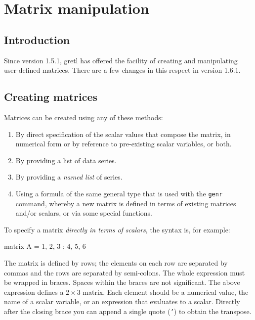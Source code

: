 \chapter{Matrix manipulation}
\label{chap:matrices}

\section{Introduction}
\label{matrix-intro}

Since version 1.5.1, gretl has offered the facility of creating and
manipulating user-defined matrices.  There are a few changes in this
respect in version 1.6.1.

\section{Creating matrices}
\label{matrix-create}

Matrices can be created using any of these methods:

\begin{enumerate}
\item By direct specification of the scalar values that compose the
  matrix, in numerical form or by reference to pre-existing
  scalar variables, or both.
\item By providing a list of data series.
\item By providing a \textit{named list} of series.
\item Using a formula of the same general type that is used
  with the \texttt{genr} command, whereby a new matrix is defined
  in terms of existing matrices and/or scalars, or via some
  special functions.
\end{enumerate}

To specify a matrix \textit{directly in terms of scalars}, the syntax
is, for example:

\begin{code}
matrix A = { 1, 2, 3 ; 4, 5, 6 }
\end{code}

The matrix is defined by rows; the elements on each row are separated
by commas and the rows are separated by semi-colons.  The whole
expression must be wrapped in braces.  Spaces within the braces are
not significant.  The above expression defines a $2\times3$ matrix.
Each element should be a numerical value, the name of a scalar
variable, or an expression that evaluates to a scalar.  Directly after
the closing brace you can append a single quote (\texttt{'}) to obtain
the transpose.

